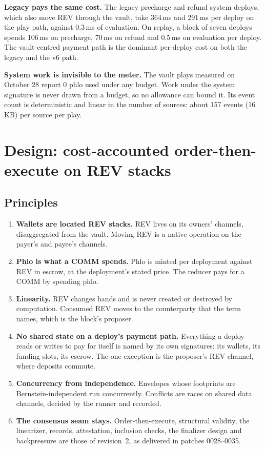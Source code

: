 \documentclass[11pt]{article}
\newcommand{\code}{\path}
\begin{document}
\textbf{Legacy \code{dev} pays the same cost.} The legacy precharge and refund system deploys, which also move REV through the vault, take 364\,ms and 291\,ms per deploy on the play path, against 0.3\,ms of evaluation. On replay, a block of seven deploys spends 106\,ms on precharge, 70\,ms on refund and 0.5\,ms on evaluation per deploy. The vault-centred payment path is the dominant per-deploy cost on both the legacy and the v6 path.

\textbf{System work is invisible to the meter.} The vault plays measured on October 28 report 0 phlo used under any budget. Work under the system signature is never drawn from a budget, so no allowance can bound it. Its event count is deterministic and linear in the number of sources: about 157 events (16\,KB) per source per play.

\section{Design: cost-accounted order-then-execute on REV stacks}\label{sec:design}

\subsection{Principles}

\begin{enumerate}[label=P\arabic*.,leftmargin=2.2em]
\item \textbf{Wallets are located REV stacks.} REV lives on its owners' channels, disaggregated from the vault. Moving REV is a native operation on the payer's and payee's channels.
\item \textbf{Phlo is what a COMM spends.} Phlo is minted per deployment against REV in escrow, at the deployment's stated price. The reducer pays for a COMM by spending phlo.
\item \textbf{Linearity.} REV changes hands and is never created or destroyed by computation. Consumed REV moves to the counterparty that the term names, which is the block's proposer.
\item \textbf{No shared state on a deploy's payment path.} Everything a deploy reads or writes to pay for itself is named by its own signatures: its wallets, its funding slots, its escrow. The one exception is the proposer's REV channel, where deposits commute.
\item \textbf{Concurrency from independence.} Envelopes whose footprints are Bernstein-independent run concurrently. Conflicts are races on shared data channels, decided by the runner and recorded.
\item \textbf{The consensus seam stays.} Order-then-execute, structural validity, the linearizer, records, attestation, inclusion checks, the finalizer design and backpressure are those of revision~2, as delivered in patches 0028--0035.
\end{enumerate}
\end{document}

